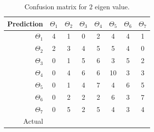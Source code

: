 \documentclass[runningheads,a4paper]{llncs}
\begin{document}
\begin{table}
\centering
\caption{Confusion matrix for $2$ eigen value.}
\label{tab:conf2}
\begin{tabular}{@{}r|ccccccc@{}}
\toprule
Prediction & \multicolumn{1}{r}{$\Theta_1$} & \multicolumn{1}{r}{$\Theta_2$} & \multicolumn{1}{r}{$\Theta_3$} & \multicolumn{1}{r}{$\Theta_4$} & \multicolumn{1}{r}{$\Theta_5$} & \multicolumn{1}{r}{$\Theta_6$} & \multicolumn{1}{r}{$\Theta_7$} \\ \midrule
$\Theta_1$ & 4                              & 1                              & 0                              & 2                              & 4                              & 4                              & 1                              \\
$\Theta_2$ & 2                              & 3                              & 4                              & 5                              & 5                              & 4                              & 0                              \\
$\Theta_3$ & 0                              & 1                              & 5                              & 6                              & 3                              & 5                              & 2                              \\
$\Theta_4$ & 0                              & 4                              & 6                              & 6                              & 10                             & 3                              & 3                              \\
$\Theta_5$ & 0                              & 1                              & 4                              & 7                              & 4                              & 6                              & 5                              \\
$\Theta_6$ & 0                              & 2                              & 2                              & 2                              & 6                              & 3                              & 7                              \\
$\Theta_7$ & 0                              & 5                              & 2                              & 5                              & 4                              & 3                              & 4                              \\ \midrule
Actual     & \multicolumn{1}{l}{}           & \multicolumn{1}{l}{}           & \multicolumn{1}{l}{}           & \multicolumn{1}{l}{}           & \multicolumn{1}{l}{}           & \multicolumn{1}{l}{}           & \multicolumn{1}{l}{}           \\ \cmidrule(r){1-1}
\end{tabular}
\end{table}
\end{document}
